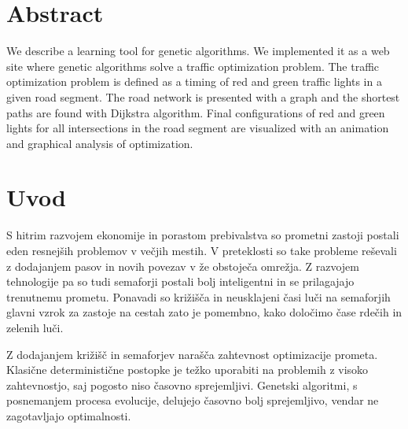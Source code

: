 \documentclass[a4paper, 12pt]{book}
\newcommand{\clearemptydoublepage}{\newpage{\pagestyle{empty}\cleardoublepage}}
\begin{document}
\clearemptydoublepage

\chapter*{Abstract}
We describe a learning tool for genetic algorithms. We implemented it as a web site where genetic algorithms solve a traffic optimization problem. The traffic optimization problem is defined as a timing of red and green traffic lights in a given road segment. The road network is presented with a graph and the shortest paths are found with Dijkstra algorithm. Final configurations of red and green lights for all intersections in the road segment are visualized with an animation and graphical analysis of optimization.

\clearemptydoublepage

\mainmatter
\setcounter{page}{1}
\pagestyle{fancy}

\chapter{Uvod}
\label{ch1}

S hitrim razvojem ekonomije in porastom prebivalstva so prometni zastoji postali eden resnej\v sih problemov v ve\v cjih mestih. V preteklosti so take probleme re\v sevali z dodajanjem pasov in novih povezav v \v ze obstoje\v ca omre\v zja. Z razvojem tehnologije pa so tudi semaforji postali bolj inteligentni in se prilagajajo trenutnemu prometu. 
Ponavadi so kri\v zi\v s\v ca  in neusklajeni \v casi lu\v ci na semaforjih glavni vzrok za zastoje na cestah zato je pomembno, kako dolo\v cimo \v case rde\v cih in zelenih lu\v ci. 
\cite{he12-aes.pdf}

Z dodajanjem kri\v zi\v s\v c in semaforjev nara\v s\v ca zahtevnost optimizacije prometa. Klasi\v cne deterministi\v cne postopke je te\v zko uporabiti na problemih z visoko zahtevnostjo, saj pogosto niso \v casovno sprejemljivi. Genetski algoritmi, s posnemanjem procesa evolucije, delujejo \v casovno bolj sprejemljivo, vendar ne zagotavljajo optimalnosti.
\end{document}
